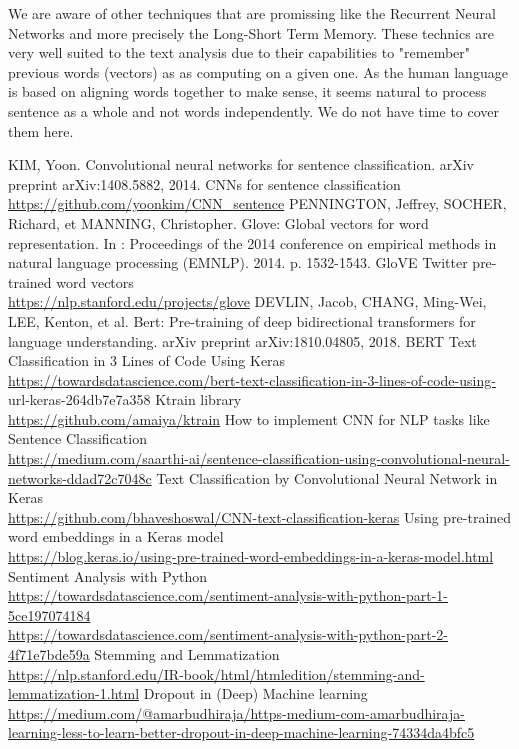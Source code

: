 \documentclass[11pt, a4paper, twocolumn]{article}
\begin{document}
We are aware of other techniques that are promissing like the Recurrent Neural Networks and more precisely the Long-Short Term Memory. These technics 
are very well suited to the text analysis due to their capabilities to "remember" previous words (vectors) as as computing on a given one. As the human 
language is based on aligning words together to make sense, it seems natural to process sentence as a whole and not words independently. 
We do not have time to cover them here.

\clearpage
\onecolumn

\begin{thebibliography}{9}
		KIM, Yoon. Convolutional neural networks for sentence classification. arXiv preprint arXiv:1408.5882, 2014.
		CNNs for sentence classification
		\\\url{https://github.com/yoonkim/CNN\_sentence}
		PENNINGTON, Jeffrey, SOCHER, Richard, et MANNING, Christopher. Glove: Global vectors for word representation. In : Proceedings of the 2014 conference on empirical methods in natural language processing (EMNLP). 2014. p. 1532-1543.
		GloVE Twitter pre-trained word vectors
		\\\url{https://nlp.stanford.edu/projects/glove}
		DEVLIN, Jacob, CHANG, Ming-Wei, LEE, Kenton, et al. Bert: Pre-training of deep bidirectional transformers for language understanding. arXiv preprint arXiv:1810.04805, 2018.
		BERT Text Classification in 3 Lines of Code Using Keras
		\\\url{https://towardsdatascience.com/bert-text-classification-in-3-lines-of-code-using-}
		\\url{-keras-264db7e7a358}
		Ktrain library
		\\\url{https://github.com/amaiya/ktrain}
		How to implement CNN for NLP tasks like Sentence Classification
		\\\url{https://medium.com/saarthi-ai/sentence-classification-using-convolutional-neural-networks-ddad72c7048c}
		Text Classification by Convolutional Neural Network in Keras
		\\\url{https://github.com/bhaveshoswal/CNN-text-classification-keras}
		Using pre-trained word embeddings in a Keras model
		\\\url{https://blog.keras.io/using-pre-trained-word-embeddings-in-a-keras-model.html}
		Sentiment Analysis with Python
		\\\url{https://towardsdatascience.com/sentiment-analysis-with-python-part-1-5ce197074184}
		\\\url{https://towardsdatascience.com/sentiment-analysis-with-python-part-2-4f71e7bde59a}
		Stemming and Lemmatization
		\\\url{https://nlp.stanford.edu/IR-book/html/htmledition/stemming-and-lemmatization-1.html}
	Dropout in (Deep) Machine learning
	\\\url{https://medium.com/@amarbudhiraja/https-medium-com-amarbudhiraja-learning-less-to-learn-better-dropout-in-deep-machine-learning-74334da4bfc5}
\end{thebibliography}
\end{document}
